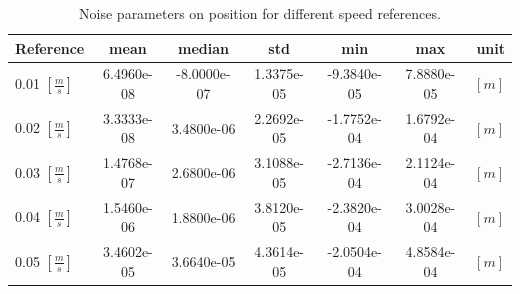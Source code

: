 \documentclass[12pt,a4paper, twoside]{article}
\begin{document}
\begin{table}[H]
	\centering
	\begin{tabular}{l||c|c|c|c|c|r} 
		\textbf{Reference}&\textbf{mean} &\textbf{median} 
		&\textbf{std} & \textbf{min}&\textbf{max}& \textbf{unit}\\ 
		\hline
		\hline 
0.01 $[\frac{m}{s}]$&6.4960e-08&-8.0000e-07&1.3375e-05&-9.3840e-05&7.8880e-05&$[m]$\\\hline
0.02 $[\frac{m}{s}]$&3.3333e-08&3.4800e-06&2.2692e-05&-1.7752e-04&1.6792e-04&$[m]$\\\hline
0.03 $[\frac{m}{s}]$&1.4768e-07&2.6800e-06&3.1088e-05&-2.7136e-04&2.1124e-04&$[m]$\\\hline
0.04 $[\frac{m}{s}]$&1.5460e-06&1.8800e-06&3.8120e-05&-2.3820e-04&3.0028e-04&$[m]$\\\hline
0.05 $[\frac{m}{s}]$&3.4602e-05&3.6640e-05&4.3614e-05&-2.0504e-04&4.8584e-04&$[m]$\\
	\end{tabular} 
	\caption{Noise parameters on position for different speed references.}
	\label{tab:pos_param}
\end{table}
	
\end{document}
